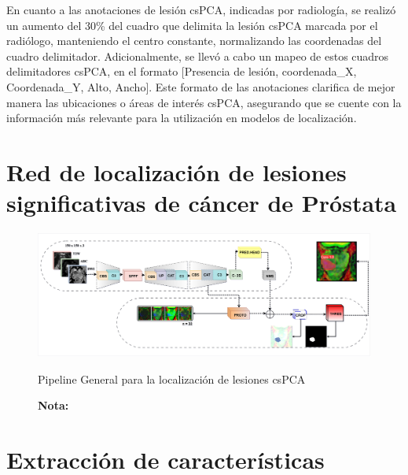 En cuanto a las anotaciones de lesión csPCA, indicadas por radiología, se realizó un aumento del 30\% del cuadro que delimita la lesión csPCA marcada por el radiólogo, manteniendo el centro constante, normalizando las coordenadas del cuadro delimitador. Adicionalmente, se llevó a cabo un mapeo de estos cuadros delimitadores csPCA, en el formato [Presencia de lesión, coordenada\_X, Coordenada\_Y, Alto,  Ancho]. Este formato de las anotaciones clarifica de mejor manera las ubicaciones o áreas de interés csPCA, asegurando que se cuente con la información más relevante para la utilización en modelos de localización. 


\section{Red de localización de lesiones significativas de cáncer de Próstata}



\begin{figure}[h!]
	\centering
	\caption{Pipeline General para la localización de lesiones csPCA}
	\includegraphics[width=1\textwidth]{imgs/pip_2.png}
	\label{fig:axADC}
\end{figure}

\begin{figure}[h!]
	\noindent \textbf{Nota:} 
\end{figure}


\section{Extracción de características}

